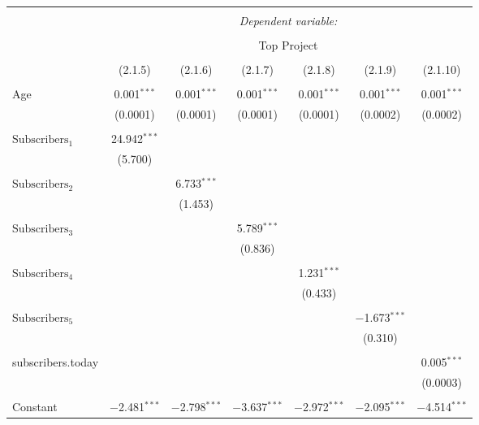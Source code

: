 
\begin{tabular}{@{\extracolsep{5pt}}lcccccc}
\\[-1.8ex]\hline
\hline \\[-1.8ex]
 & \multicolumn{6}{c}{\textit{Dependent variable:}} \\
\cline{2-7}
\\[-1.8ex] & \multicolumn{6}{c}{Top Project} \\
\\[-1.8ex] & (2.1.5) & (2.1.6) & (2.1.7) & (2.1.8) & (2.1.9) & (2.1.10)\\ 
\hline \\[-1.8ex]
 Age & 0.001$^{***}$ & 0.001$^{***}$ & 0.001$^{***}$ & 0.001$^{***}$ & 0.001$^{***}$ & 0.001$^{***}$ \\
  & (0.0001) & (0.0001) & (0.0001) & (0.0001) & (0.0002) & (0.0002) \\
  & & & & & & \\
 $\text{Subscribers}_{1}$ & 24.942$^{***}$ &  &  &  &  &  \\
  & (5.700) &  &  &  &  &  \\
  & & & & & & \\
 $\text{Subscribers}_{2}$ &  & 6.733$^{***}$ &  &  &  &  \\
  &  & (1.453) &  &  &  &  \\
  & & & & & & \\
 $\text{Subscribers}_{3}$ &  &  & 5.789$^{***}$ &  &  &  \\
  &  &  & (0.836) &  &  &  \\
  & & & & & & \\
 $\text{Subscribers}_{4}$ &  &  &  & 1.231$^{***}$ &  &  \\
  &  &  &  & (0.433) &  &  \\
  & & & & & & \\
 $\text{Subscribers}_{5}$ &  &  &  &  & $-$1.673$^{***}$ &  \\
  &  &  &  &  & (0.310) &  \\
  & & & & & & \\
 subscribers.today &  &  &  &  &  & 0.005$^{***}$ \\
  &  &  &  &  &  & (0.0003) \\
  & & & & & & \\
 Constant & $-$2.481$^{***}$ & $-$2.798$^{***}$ & $-$3.637$^{***}$ & $-$2.972$^{***}$ & $-$2.095$^{***}$ & $-$4.514$^{***}$ \\

\end{tabular}
